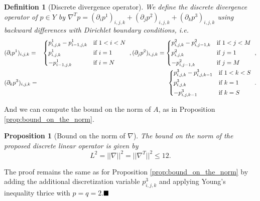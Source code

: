 \documentclass[abstracton]{scrreprt}
\newcommand{\qed}{$\hfill\blacksquare$}
\newtheorem{proposition}[theorem]{Proposition}
\newtheorem{definition}[theorem]{Definition}
\newenvironment{proof}[1][Proof]{\begin{trivlist}
\item[\hskip \labelsep {\bfseries #1}]}{\end{trivlist}}
\begin{document}
        \begin{definition}[Discrete divergence operator] %
        \label{def:discrete_divergence_operator_ms}
            We define the discrete divergence operator of $p \in Y$ by $\nabla^{T} p = (\partial_{i}p^{1})_{i, j, k} + (\partial_{j}p^{2})_{i, j, k} + (\partial_{k}p^{3})_{i, j, k}$ using backward differences with Dirichlet boundary conditions, i.e.
                \begin{eqnarray}
                    &(\partial_{i}p^{1})_{i, j, k} =&
                        \begin{dcases*}
                            p^{1}_{i, j, k} - p^{1}_{i-1, j, k} & \textnormal{if $1 < i < N$} \\
                            p^{1}_{i, j, k} & \textnormal{if $i = 1$} \\
                            -p^{1}_{i-1, j, k} & \textnormal{if $i = N$}
                        \end{dcases*},
                    \notag
                    (\partial_{j}p^{2})_{i, j, k} =
                        \begin{dcases*}
                            p^{2}_{i, j, k} - p^{2}_{i, j-1, k} & \textnormal{if $1 < j < M$} \\
                            p^{2}_{i, j, k} & \textnormal{if $j = 1$} \\
                            -p^{2}_{i, j-1, k} & \textnormal{if $j = M$}
                        \end{dcases*},
                    \notag \\
                    &(\partial_{k}p^{3})_{i, j, k} =&
                        \begin{dcases*}
                            p^{3}_{i, j, k} - p^{3}_{i, j, k-1} & \textnormal{if $1 < k < S$} \\
                            p^{3}_{i, j, k} & \textnormal{if $k = 1$} \\
                            -p^{3}_{i, j, k-1} & \textnormal{if $k = S$}
                        \end{dcases*}.
                    \notag
                \end{eqnarray}
        \end{definition}
        And we can compute the bound on the norm of $A$, as in Proposition \ref{prop:bound_on_the_norm}.
        \begin{proposition}[Bound on the norm of $\nabla$] %
            \label{prop:bound_on_the_norm_ms}
            The bound on the norm of the proposed discrete linear operator is given by
                $$
                    L^{2} = ||\nabla||^{2} = ||\nabla^{T}||^{2} \le 12.
                $$
        \end{proposition}
        \begin{proof}
        	The proof remains the same as for Proposition \ref{prop:bound_on_the_norm} by adding the additional discretization variable $p^{3}_{i,j,k}$ and applying Young's inequality thrice with $p = q = 2$.\qed
        \end{proof}
\end{document}
